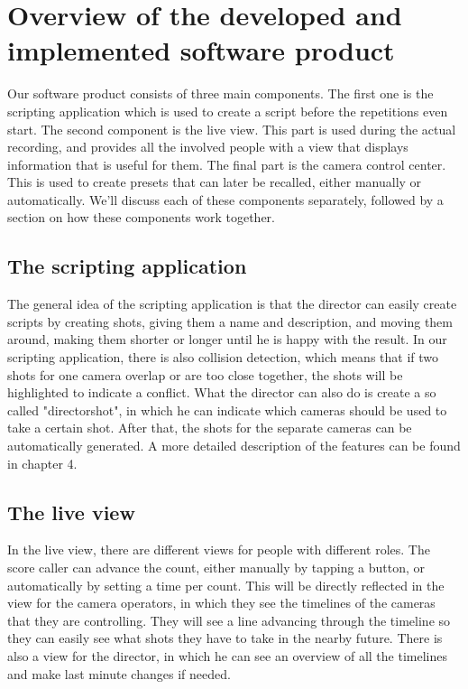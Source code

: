 \section{Overview of the developed and implemented software product}

Our software product consists of three main components. The first one is the scripting application which is used to create a script before the repetitions even start. The second component is the live view. This part is used during the actual recording, and provides all the involved people with a view that displays information that is useful for them. The final part is the camera control center. This is used to create presets that can later be recalled, either manually or automatically. We'll discuss each of these components separately, followed by a section on how these components work together.

\subsection*{The scripting application}
The general idea of the scripting application is that the director can easily create scripts by creating shots, giving them a name and description, and moving them around, making them shorter or longer until he is happy with the result. In our scripting application, there is also collision detection, which means that if two shots for one camera overlap or are too close together, the shots will be highlighted to indicate a conflict. What the director can also do is create a so called "directorshot", in which he can indicate which cameras should be used to take a certain shot. After that, the shots for the separate cameras can be automatically generated. A more detailed description of the features can be found in chapter 4.

\subsection*{The live view}
In the live view, there are different views for people with different roles. The score caller can advance the count, either manually by tapping a button, or automatically by setting a time per count. This will be directly reflected in the view for the camera operators, in which they see the timelines of the cameras that they are controlling. They will see a line advancing through the timeline so they can easily see what shots they have to take in the nearby future. There is also a view for the director, in which he can see an overview of all the timelines and make last minute changes if needed. 

